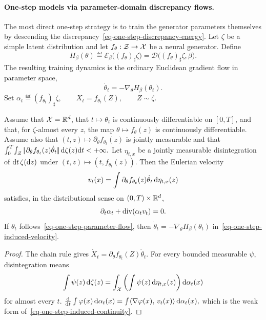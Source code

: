 \paragraph{One-step models via parameter-domain discrepancy flows.}
The most direct one-step strategy is to train the generator parameters themselves by descending the discrepancy~\eqref{eq-one-step-discrepancy-energy}. Let $\zeta$ be a simple latent distribution and let $f_\theta:\mathcal{Z}\to\mathcal{X}$ be a neural generator. Define
\begin{equation}\label{eq-one-step-parameter-discrepancy}
H_\beta(\theta)
\eqdef
\mathcal E_\beta\big((f_\theta)_\sharp\zeta\big)
=
\mathcal D\big((f_\theta)_\sharp\zeta,\beta\big).
\end{equation}
The resulting training dynamics is the ordinary Euclidean gradient flow in parameter space,
\begin{equation}\label{eq-one-step-parameter-flow}
\dot\theta_t=-\nabla_\theta H_\beta(\theta_t).
\end{equation}
Set
\(\alpha_t\eqdef(f_{\theta_t})_\sharp\zeta, \qquad X_t=f_{\theta_t}(Z), \qquad Z\sim\zeta.\)
\begin{prop}\label{prop-parameter-path-continuity}
Assume that $\mathcal{X}=\mathbb{R}^d$, that $t\mapsto\theta_t$ is continuously differentiable on $[0,T]$, and that, for $\zeta$-almost every $z$, the map $\theta\mapsto f_\theta(z)$ is continuously differentiable. Assume also that $(t,z)\mapsto\partial_\theta f_{\theta_t}(z)$ is jointly measurable and that
\(\int_0^T\!\int_{\mathcal{Z}} |\!| \partial_\theta f_{\theta_t}(z)\dot\theta_t |\!| \,\mathrm{d}\zeta(z)\mathrm{d} t<+\infty.\)
Let $\eta_{t,x}$ be a jointly measurable disintegration of $\mathrm{d} t\,\zeta(\mathrm{d} z)$ under $(t,z)\mapsto(t,f_{\theta_t}(z))$. Then the Eulerian velocity
\begin{equation}\label{eq-one-step-induced-velocity}
v_t(x)=\int \partial_\theta f_{\theta_t}(z)\dot\theta_t\,\mathrm{d}\eta_{t,x}(z)
\end{equation}
satisfies, in the distributional sense on $(0,T)\times\mathbb{R}^d$,
\begin{equation}\label{eq-one-step-induced-continuity}
\partial_t\alpha_t+\operatorname{div}(\alpha_t v_t)=0.
\end{equation}
If $\theta_t$ follows~\eqref{eq-one-step-parameter-flow}, then $\dot\theta_t=-\nabla_\theta H_\beta(\theta_t)$ in~\eqref{eq-one-step-induced-velocity}.
\end{prop}
\begin{proof}
The chain rule gives $\dot X_t=\partial_\theta f_{\theta_t}(Z)\dot\theta_t$. For every bounded measurable $\psi$, disintegration means
\[
\int \psi(z)\,\mathrm{d}\zeta(z)=\int_{\mathcal{X}}\left(\int \psi(z)\,\mathrm{d}\eta_{t,x}(z)\right)\mathrm{d}\alpha_t(x)
\]
for almost every $t$.
\(\frac{\mathrm{d}}{\mathrm{d} t}\int \varphi(x)\,\mathrm{d}\alpha_t(x) = \int \langle \nabla\varphi(x),\,v_t(x)\rangle\,\mathrm{d}\alpha_t(x),\)
which is the weak form of~\eqref{eq-one-step-induced-continuity}.
\end{proof}
